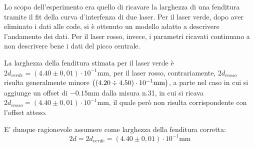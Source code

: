 \documentclass[10pt,twocolumn]{article}
\begin{document}
\noindent Lo scopo dell'esperimento era quello di ricavare la larghezza di una fenditura tramite il fit 
della curva d'interfenza di due laser. Per il laser verde, dopo aver eliminato i dati alle code, si è
ottenuto un modello adatto a descrivere l'andamento dei dati. Per il laser rosso, invece, i parametri 
ricavati continuano a non descrivere bene i dati del picco centrale. 

\noindent La larghezza della fenditura stimata per il laser verde è $2d_{verde} = (4.40 \pm 0,01) \cdot 10^{-1} \text{mm}$, per il laser 
rosso, contrariamente, $2d_{rosso}$ risulta generalmente minore $\left((4.20 \divisionsymbol 4.50 ) \cdot 10^{-1}\text{mm}\right)$, a parte nel caso
in cui si aggiunge un offset di $- 0.15 \text{mm}$ dalla misura n.31, in cui si ricava $2d_{rosso} = (4.40 \pm 0,01) \cdot 10^{-1} \text{mm}$,
il quale però non risulta corrispondente con l'offset atteso.

\noindent E' dunque ragionevole assumere come larghezza della fenditura corretta:
\[
2d = 2d_{verde} = (4.40 \pm 0,01) \cdot 10^{-1} \text{mm}
\]
\end{document}
